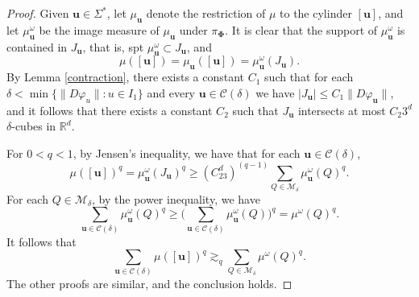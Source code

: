 \documentclass[12pt]{amsart}
\theoremstyle{plain}
\theoremstyle{definition}
\theoremstyle{remark}
\newcommand{\bu}{\mathbf{u}}
\begin{document}
\begin{proof}
Given $\bu\in\Sigma^*$, let $\mu_\mathbf{u}$ denote the restriction of $\mu$ to the cylinder $[\bu]$, and let $\mu^\omega_\mathbf{u}$ be the image measure of $\mu_\mathbf{u}$ under $\pi_{\boldsymbol{\Phi}}$. It is clear that the support of $\mu^\omega_\mathbf{u}$ is contained in $J_\mathbf{u}$, that is, spt $\mu^\omega_\mathbf{u}\subset J_\mathbf{u}$, and
$$
\mu([\bu])=\mu_\mathbf{u}([\bu])=\mu^\omega_\mathbf{u}(J_\mathbf{u}).
$$
By Lemma \ref{contraction}, there exists a constant $C_1$ such that for each $\delta<\min\{\|D\varphi_u\|:u\in I_1\}$ and every $\mathbf{u}\in\mathcal{C}(\delta)$ we have $|J_\bu|\le C_1\|D\varphi_\bu\|$, and it follows that there exists a constant $C_2$ such that $J_\mathbf{u}$ intersects at most $C_2 3^d$  $\delta$-cubes in $\mathbb{R}^d$. 

For $0<q<1$,  by Jensen's inequality, we have that  for each $\mathbf{u}\in\mathcal{C}(\delta)$,
$$
\mu([\bu])^q=\mu^\omega_\mathbf{u}(J_\mathbf{u})^q\ge (C_23^d)^{(q-1)}\sum_{Q\in{\mathcal{M}_\delta}}\mu^\omega_\mathbf{u}(Q)^q.
$$
For each $Q\in\mathcal{M}_\delta$, by the power inequality, we have
$$
\sum_{\mathbf{u}\in\mathcal{C}(\delta)}\mu^\omega_\mathbf{u}(Q)^q\ge\big(\sum_{\mathbf{u}\in\mathcal{C}(\delta)}\mu^\omega_\mathbf{u}(Q)\big)^q=\mu^\omega(Q)^q.
$$
It follows that
$$
\sum_{\mathbf{u}\in\mathcal{C}(\delta)}\mu([\bu])^q  \gtrsim_q \sum_{Q\in{\mathcal{M}_\delta}}\mu^\omega(Q)^q.
$$
The other proofs are similar, and  the conclusion holds.
\end{proof}
\end{document}
